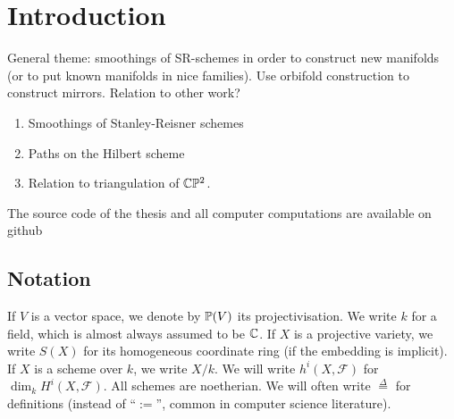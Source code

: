 \chapter{Introduction}
\label{sec:intro}

General theme: smoothings of SR-schemes in order to construct new manifolds (or to put known manifolds in nice families). Use orbifold construction to construct mirrors. Relation to other work?


\begin{enumerate}
    \item Smoothings of Stanley-Reisner schemes
    \item Paths on the Hilbert scheme
    \item Relation to triangulation of $\C \P^2$.
\end{enumerate}

The source code of the thesis and all computer computations are available on github


\listoftodos[Notes]

\section{Notation}

If $V$ is a vector space, we denote by $\P(V)$ its projectivisation. We write $k$ for a field, which is almost always assumed to be $\C$. If $X$ is a projective variety, we write $S(X)$ for its homogeneous coordinate ring (if the embedding is implicit). If $X$ is a scheme over $k$, we write $X/k$. We will write $h^i(X,\mathscr F)$ for $\dim_k H^i(X,\mathscr F)$. All schemes are noetherian. We will often write $\stackrel \Delta = $ for definitions (instead of  ``$:=$'', common in computer science literature).